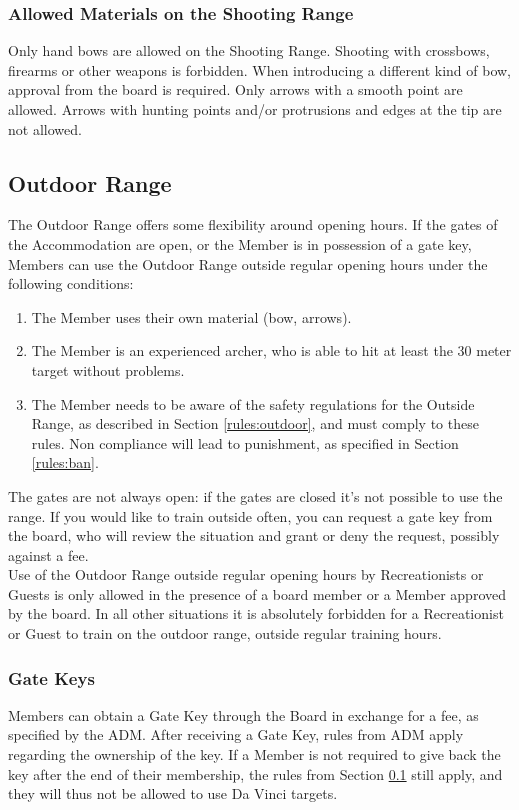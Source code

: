 \documentclass[a4paper]{article}
\begin{document}
\subsubsection{Allowed Materials on the Shooting Range}
Only hand bows are allowed on the Shooting Range. Shooting with crossbows, firearms or other weapons is forbidden. When introducing a different kind of bow, approval from the board is required. Only arrows with a smooth point are allowed. Arrows with hunting points and/or protrusions and edges at the tip are not allowed.

\subsection{Outdoor Range}
\label{section:outdoor}
The Outdoor Range offers some flexibility around opening hours. If the gates of the Accommodation are open, or the Member is in possession of a gate key, Members can use the Outdoor Range outside regular opening hours under the following conditions:

\begin{enumerate}
\item The Member uses their own material (bow, arrows).
\item The Member is an experienced archer, who is able to hit at least the 30 meter target without problems.
\item The Member needs to be aware of the safety regulations for the Outside Range, as described in Section \ref{rules:outdoor}, and must comply to these rules. Non compliance will lead to punishment, as specified in Section \ref{rules:ban}.
\end{enumerate}

The gates are not always open: if the gates are closed it’s not possible to use the range. If you would like to train outside often, you can request a gate key from the board, who will review the situation and grant or deny the request, possibly against a fee. \\

Use of the Outdoor Range outside regular opening hours by Recreationists or Guests is only allowed in the presence of a board member or a Member approved by the board. In all other situations it is absolutely forbidden for a Recreationist or Guest to train on the outdoor range, outside regular training hours. 

\subsubsection{Gate Keys}
Members can obtain a Gate Key through the Board in exchange for a fee, as specified by the ADM. After receiving a Gate Key, rules from ADM apply regarding the ownership of the key. If a Member is not required to give back the key after the end of their membership, the rules from Section \ref{section:outdoor} still apply, and they will thus not be allowed to use Da Vinci targets.
\end{document}
